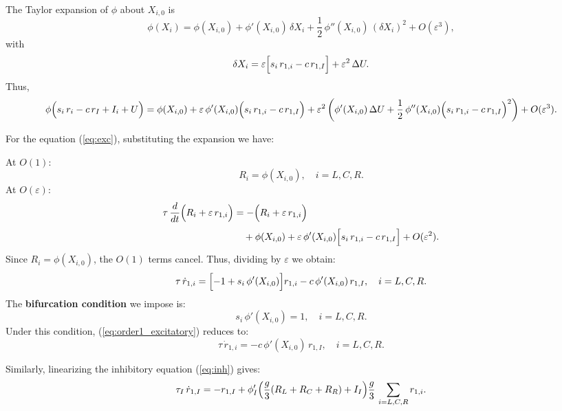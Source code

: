 \documentclass[ENG]{fancynotes}
\begin{document}
The Taylor expansion of \(\phi\) about \(X_{i,0}\) is
\begin{equation}
  \phi(X_i) = \phi(X_{i,0}) + \phi'(X_{i,0})\,\delta X_i + \frac{1}{2}\,\phi''(X_{i,0})\,(\delta X_i)^2 + O(\varepsilon^3),
  \label{eq:taylor_exp}
\end{equation}
with
\[
\delta X_i = \varepsilon\Bigl[s_i\,r_{1,i} - c\,r_{1,I}\Bigr] + \varepsilon^2\,\Delta U.
\]
Thus,
\[
\phi\Bigl(s_i\,r_i - c\,r_I + I_i + U\Bigr) = \phi(X_{i,0}) + \varepsilon\,\phi'(X_{i,0})\Bigl(s_i\,r_{1,i} - c\,r_{1,I}\Bigr) + \varepsilon^2\left(\phi'(X_{i,0})\,\Delta U + \frac{1}{2}\,\phi''(X_{i,0})\Bigl(s_i\,r_{1,i} - c\,r_{1,I}\Bigr)^2\right) + O(\varepsilon^3).
\]


For the equation (\ref{eq:exc}), substituting the expansion we have:

At \(O(1)\):
\[
R_i = \phi(X_{i,0}), \quad i=L,C,R.
\]
At \(O(\varepsilon)\):
\begin{align}
  \tau\,\frac{d}{dt}\Bigl(R_i + \varepsilon\,r_{1,i}\Bigr) &= -\Bigl(R_i + \varepsilon\,r_{1,i}\Bigr) \nonumber\\[1mm]
  &\quad + \phi(X_{i,0}) + \varepsilon\,\phi'(X_{i,0})\Bigl[s_i\,r_{1,i}-c\,r_{1,I}\Bigr] + O(\varepsilon^2).
  \label{eq:order1}
\end{align}
Since \(R_i=\phi(X_{i,0})\), the \(O(1)\) terms cancel. Thus, dividing by \(\varepsilon\) we obtain:
\begin{equation}
  \tau\,\dot{r}_{1,i} = \Bigl[-1 + s_i\,\phi'(X_{i,0})\Bigr] r_{1,i} - c\,\phi'(X_{i,0})\,r_{1,I}, \quad i=L,C,R.
  \label{eq:order1_excitatory}
\end{equation}
The \textbf{bifurcation condition} we impose is:
\begin{equation}
  s_i\,\phi'(X_{i,0}) = 1, \quad i=L,C,R.
  \label{eq:bifurcation_condition}
\end{equation}
Under this condition, (\ref{eq:order1_excitatory}) reduces to:
\begin{equation}
  \tau\,\dot{r}_{1,i} = - c\,\phi'(X_{i,0})\,r_{1,I}, \quad i=L,C,R.
  \label{eq:order1_ex_final}
\end{equation}

Similarly, linearizing the inhibitory equation (\ref{eq:inh}) gives:
\begin{equation}
  \tau_I\,\dot{r}_{1,I} = -r_{1,I} + \phi_I'\Bigl(\frac{g}{3}(R_L+R_C+R_R)+I_I\Bigr)\frac{g}{3}\,\sum_{i=L,C,R}r_{1,i}.
  \label{eq:order1_inhibitory}
\end{equation}
\end{document}
